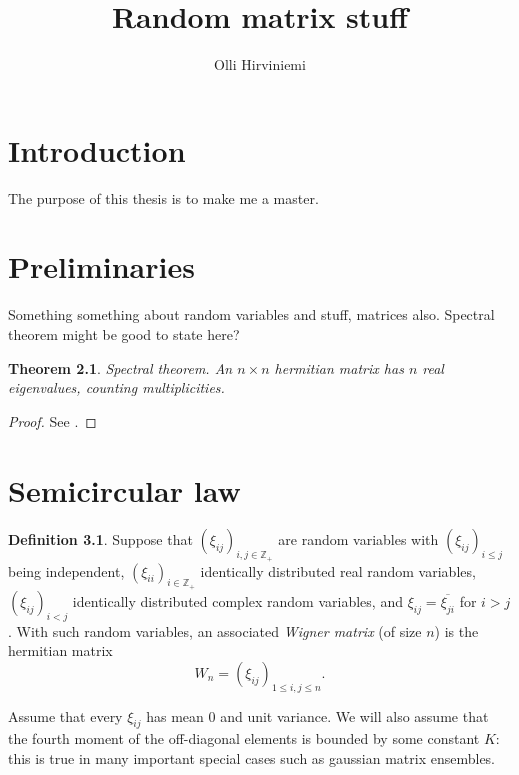 \documentclass[12pt,a4paper,leqno]{report}
\title{Random matrix stuff}
\author{Olli Hirviniemi}
\date{}
\newcommand{\Z}{\mathbb{Z}}
\theoremstyle{plain}
\newtheorem{theo}[equation]{Theorem}
\theoremstyle{definition}
\newtheorem{defi}[equation]{Definition}
\theoremstyle{remark}
\begin{document}
\maketitle

\tableofcontents

\chapter{Introduction}\label{intro}

The purpose of this thesis is to make me a master.


\chapter{Preliminaries}\label{gener}

Something something about random variables and stuff, matrices also. Spectral theorem might be good to state here?

\begin{theo}\label{specth}
\emph{Spectral theorem.} An $n \times n$ hermitian matrix has $n$ real eigenvalues, counting multiplicities.
\end{theo}

\begin{proof}
See \cite{Tao}.
\end{proof}

\chapter{Semicircular law}\label{semic}

\begin{defi}\label{wigmat}
Suppose that $(\xi_{ij})_{i,j \in \Z_+}$ are random variables with $(\xi_{ij})_{i \leq j}$ being independent, $(\xi_{ii})_{i \in \Z_+}$ identically distributed real random variables, $(\xi_{ij})_{i<j}$ identically distributed complex random variables, and $\xi_{ij}=\overline{\xi_{ji}}$ for $i>j$. With such random variables, an associated \emph{Wigner matrix} (of size $n$) is the hermitian matrix
\begin{equation*}
W_n = (\xi_{ij})_{1\leq i,j \leq n}.
\end{equation*} 
\end{defi}

Assume that every $\xi_{ij}$ has mean $0$ and unit variance. We will also assume that the fourth moment of the off-diagonal elements is bounded by some constant $K$: this is true in many important special cases such as gaussian matrix ensembles.
\end{document}
